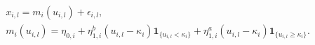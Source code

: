 \begin{equation}
  \begin{gathered}
    x_{i, l} = m_{i}(u_{i, l}) + \epsilon_{i, l}, \\
    m_{i}(u_{i, l}) =
      \eta_{0, i} +
      \eta^{b}_{1, i}(u_{i, l} - \kappa_{i}) \boldsymbol{1}_{\{u_{i, l} < \kappa_{i}\}} +
      \eta^{a}_{1, i}(u_{i, l} - \kappa_{i}) \boldsymbol{1}_{\{u_{i, l} \geq \kappa_{i}\}}.
  \end{gathered}
  \label{eqn:piecewise-fluid-model}
\end{equation}